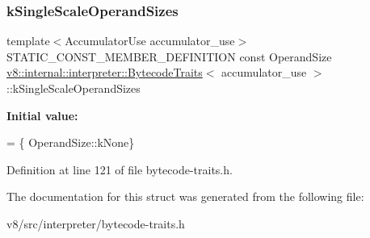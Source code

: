 \subsubsection{\texorpdfstring{k\+Single\+Scale\+Operand\+Sizes}{kSingleScaleOperandSizes}}
{\footnotesize\ttfamily template$<$Accumulator\+Use accumulator\+\_\+use$>$ \\
S\+T\+A\+T\+I\+C\+\_\+\+C\+O\+N\+S\+T\+\_\+\+M\+E\+M\+B\+E\+R\+\_\+\+D\+E\+F\+I\+N\+I\+T\+I\+ON const Operand\+Size \mbox{\hyperlink{structv8_1_1internal_1_1interpreter_1_1BytecodeTraits}{v8\+::internal\+::interpreter\+::\+Bytecode\+Traits}}$<$ accumulator\+\_\+use $>$\+::k\+Single\+Scale\+Operand\+Sizes\hspace{0.3cm}{\ttfamily [static]}}

{\bfseries Initial value\+:}
\begin{DoxyCode}
= \{
        OperandSize::kNone\}
\end{DoxyCode}


Definition at line 121 of file bytecode-\/traits.\+h.



The documentation for this struct was generated from the following file\+:\begin{DoxyCompactItemize}
\item 
v8/src/interpreter/bytecode-\/traits.\+h\end{DoxyCompactItemize}
